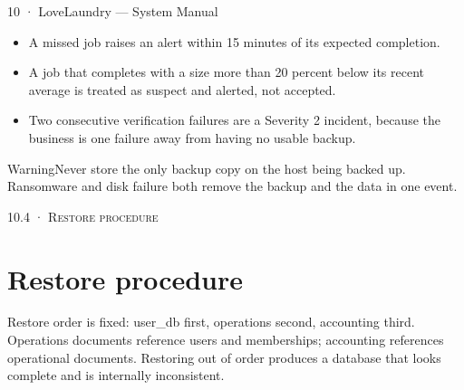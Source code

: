 \documentclass[11pt,a4paper,oneside]{book}
\begin{document}
10 · LoveLaundry — System Manual

\begin{itemize}
\item A missed job raises an alert within 15 minutes of its expected completion.
\item A job that completes with a size more than 20 percent below its recent average is treated as suspect and alerted, not accepted.
\item Two consecutive verification failures are a Severity 2 incident, because the business is one failure away from having no usable backup.
\end{itemize}
\begin{notebox}WarningNever store the only backup copy on the host being backed up. Ransomware and disk failure both remove the backup and the data in one event.\end{notebox}
\textsc{\small\color{crimson}10.4 · Restore procedure}\par\medskip
\section*{Restore procedure}
Restore order is fixed: user\_db first, operations second, accounting third. Operations documents reference users and memberships; accounting references operational documents. Restoring out of order produces a database that looks complete and is internally inconsistent.
\end{document}
